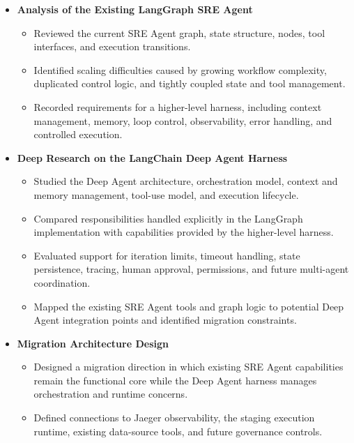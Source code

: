 \begin{itemize}
    \item \textbf{Analysis of the Existing LangGraph SRE Agent}
    \begin{itemize}
        \item Reviewed the current SRE Agent graph, state structure, nodes, tool interfaces, and execution transitions.
        \item Identified scaling difficulties caused by growing workflow complexity, duplicated control logic, and tightly coupled state and tool management.
        \item Recorded requirements for a higher-level harness, including context management, memory, loop control, observability, error handling, and controlled execution.
    \end{itemize}

    \item \textbf{Deep Research on the LangChain Deep Agent Harness}
    \begin{itemize}
        \item Studied the Deep Agent architecture, orchestration model, context and memory management, tool-use model, and execution lifecycle.
        \item Compared responsibilities handled explicitly in the LangGraph implementation with capabilities provided by the higher-level harness.
        \item Evaluated support for iteration limits, timeout handling, state persistence, tracing, human approval, permissions, and future multi-agent coordination.
        \item Mapped the existing SRE Agent tools and graph logic to potential Deep Agent integration points and identified migration constraints.
    \end{itemize}

    \item \textbf{Migration Architecture Design}
    \begin{itemize}
        \item Designed a migration direction in which existing SRE Agent capabilities remain the functional core while the Deep Agent harness manages orchestration and runtime concerns.
        \item Defined connections to Jaeger observability, the staging execution runtime, existing data-source tools, and future governance controls.
    \end{itemize}
\end{itemize}

